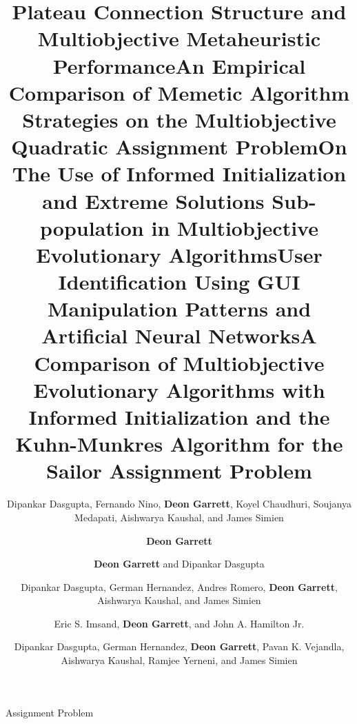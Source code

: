 \documentclass[a4paper,10pt]{cvclean}
\begin{document}
\begin{publications}
\begin{conferencepapers}
\begin{paper}
{        Assignment Problem}
      \author{Dipankar Dasgupta, Fernando Nino, \textbf{Deon Garrett}, Koyel Chaudhuri,
        Soujanya Medapati, Aishwarya Kaushal, and James Simien}
    \end{paper}
    \begin{paper}
      \title{Plateau Connection Structure and Multiobjective Metaheuristic
        Performance}
      \author{\textbf{Deon Garrett}}
    \end{paper}
    \begin{paper}
      \title{An Empirical Comparison of Memetic Algorithm Strategies on the
        Multiobjective Quadratic Assignment Problem}
      \author{\textbf{Deon Garrett} and Dipankar Dasgupta}
    \end{paper}
    \begin{paper}
      \title{On The Use of Informed Initialization and Extreme Solutions
        Sub-population in Multiobjective Evolutionary Algorithms}
      \author{Dipankar Dasgupta, German Hernandez, Andres Romero, \textbf{Deon Garrett},
        Aishwarya Kaushal, and James Simien}
    \end{paper}
    \begin{paper}
      \title{User Identification Using GUI Manipulation Patterns and Artificial
        Neural Networks}
      \author{Eric S. Imsand, \textbf{Deon Garrett}, and John A. Hamilton Jr.}
    \end{paper}
    \begin{paper}
      \title{A Comparison of Multiobjective Evolutionary Algorithms with
        Informed Initialization and the Kuhn-Munkres Algorithm for the Sailor
        Assignment Problem} 
      \author{Dipankar Dasgupta, German Hernandez, \textbf{Deon Garrett}, Pavan
        K. Vejandla, Aishwarya Kaushal, Ramjee Yerneni, and James Simien}

\end{paper}
\end{conferencepapers}
\end{publications}
\end{document}
